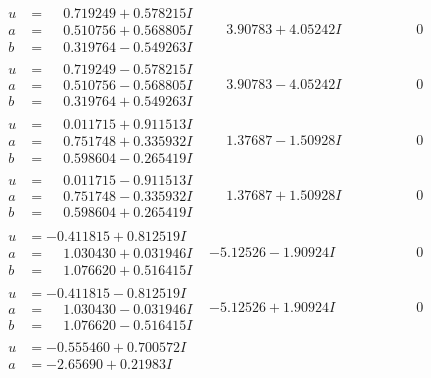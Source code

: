 \documentclass[1p]{elsarticle_modified}
\theoremstyle{definition}
\begin{document}
$$\begin{array}{c|c|c}
\begin{aligned}
u &= \phantom{-}0.719249 + 0.578215 I \\
a &= \phantom{-}0.510756 + 0.568805 I \\
b &= \phantom{-}0.319764 - 0.549263 I\end{aligned}
 & \phantom{-}3.90783 + 4.05242 I & \phantom{-0.000000 } 0 \\ \hline\begin{aligned}
u &= \phantom{-}0.719249 - 0.578215 I \\
a &= \phantom{-}0.510756 - 0.568805 I \\
b &= \phantom{-}0.319764 + 0.549263 I\end{aligned}
 & \phantom{-}3.90783 - 4.05242 I & \phantom{-0.000000 } 0 \\ \hline\begin{aligned}
u &= \phantom{-}0.011715 + 0.911513 I \\
a &= \phantom{-}0.751748 + 0.335932 I \\
b &= \phantom{-}0.598604 - 0.265419 I\end{aligned}
 & \phantom{-}1.37687 - 1.50928 I & \phantom{-0.000000 } 0 \\ \hline\begin{aligned}
u &= \phantom{-}0.011715 - 0.911513 I \\
a &= \phantom{-}0.751748 - 0.335932 I \\
b &= \phantom{-}0.598604 + 0.265419 I\end{aligned}
 & \phantom{-}1.37687 + 1.50928 I & \phantom{-0.000000 } 0 \\ \hline\begin{aligned}
u &= -0.411815 + 0.812519 I \\
a &= \phantom{-}1.030430 + 0.031946 I \\
b &= \phantom{-}1.076620 + 0.516415 I\end{aligned}
 & -5.12526 - 1.90924 I & \phantom{-0.000000 } 0 \\ \hline\begin{aligned}
u &= -0.411815 - 0.812519 I \\
a &= \phantom{-}1.030430 - 0.031946 I \\
b &= \phantom{-}1.076620 - 0.516415 I\end{aligned}
 & -5.12526 + 1.90924 I & \phantom{-0.000000 } 0 \\ \hline\begin{aligned}
u &= -0.555460 + 0.700572 I \\
a &= -2.65690 + 0.21983 I \\

\end{aligned}
\end{array}$$
\end{document}
